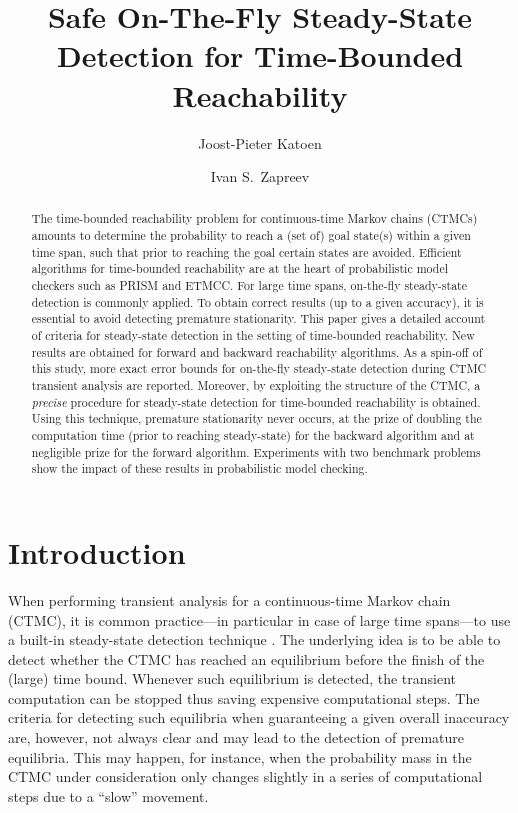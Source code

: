 \documentclass{entcs}
\newcommand{\Section}[1]{\section{#1}}
\begin{document}


	\begin{frontmatter}
		\title{Safe On-The-Fly Steady-State Detection for Time-Bounded Reachability}
		
		\author[Aachen,Twente]{Joost-Pieter Katoen}
		\author[Aachen,Twente]{Ivan S.\ Zapreev}

		\address[Aachen]{Software Modeling and Verification Group\\ RWTH Aachen\\ Aachen, Germany}
		\address[Twente]{Formal Methods and Tools Group\\ University of Twente\\ Enschede, The Netherlands}
		
		\begin{abstract}
			The time-bounded reachability problem for continuous-time Markov chains (CTMCs) amounts to determine the probability to reach a (set of) goal state(s) within a given time span, such that prior to reaching the goal certain states are avoided. Efficient algorithms for time-bounded reachability are at the heart of probabilistic model checkers such as PRISM and ETMCC. For large time spans, on-the-fly steady-state detection is commonly applied. To obtain correct results (up to a given accuracy), it is essential to avoid detecting premature stationarity. This paper gives a detailed account of criteria for  steady-state detection in the setting of time-bounded reachability. New results are obtained for forward and backward reachability algorithms. As a spin-off of this study, more exact error bounds for on-the-fly steady-state detection during CTMC transient analysis are reported. Moreover, by exploiting the structure of the CTMC, a \emph{precise} procedure for steady-state detection for time-bounded reachability is obtained. Using this technique, premature stationarity never occurs, at the prize of doubling the computation time (prior to reaching steady-state) for the backward algorithm and at negligible prize for the forward algorithm. Experiments with two benchmark problems show the impact of these results in probabilistic model checking.
		\end{abstract}
	\end{frontmatter}

\Section{Introduction}

When performing transient analysis for a continuous-time Markov chain (CTMC), it is common practice---in particular in case of large time spans---to use a built-in steady-state detection technique \cite{MalhotraMT_MR94,YounesKNP_STTT05}. 
The underlying idea is to be able to detect whether the CTMC has reached an equilibrium before the finish of the (large) time bound. Whenever such equilibrium is detected, the transient computation can be stopped thus saving expensive computational steps. 
The criteria for detecting such equilibria when guaranteeing a given overall inaccuracy are, however, not always clear and may lead to the detection of premature equilibria. 
This may happen, for instance, when the probability mass in the CTMC under consideration only changes slightly in a series of computational steps due to a ``slow'' movement.
\end{document}
